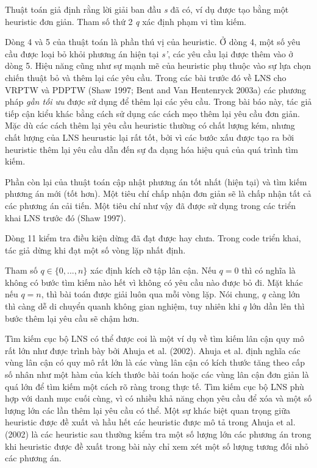 Thuật toán giả định rằng lời giải ban đầu \textit{s} đã có, ví dụ được tạo bằng một heuristic đơn giản. Tham số thứ 2 \textit{q} xác định phạm vi tìm kiếm. 

Dòng 4 và 5 của thuật toán là phần thú vị của heuristic. Ở dòng 4, một số yêu cầu được loại bỏ khỏi phương án hiện tại \textit{s'}, các yêu cầu lại được thêm vào ở dòng 5. Hiệu năng cũng như sự mạnh mẽ của heuristic phụ thuộc vào sự lựa chọn chiến thuật bỏ và thêm lại các yêu cầu. Trong các bài trước đó về LNS cho VRPTW và PDPTW (Shaw 1997; Bent and Van Hentenryck 2003a) các phương pháp \textit{gần tối ưu} được sử dụng để thêm lại các yêu cầu. Trong bài báo này, tác giả tiếp cận kiểu khác bằng cách sử dụng các cách mẹo thêm lại yêu cầu đơn giản. Mặc dù các cách thêm lại yêu cầu heuristic thường có chất lượng kém, nhưng chất lượng của LNS heurustic lại rất tốt, bởi vì các bước xấu được tạo ra bởi heuristic thêm lại yêu cầu dẫn đến sự đa dạng hóa hiệu quả của quá trình tìm kiếm. 

Phần còn lại của thuật toán cập nhật phương án tốt nhất (hiện tại) và tìm kiếm phương án mới (tốt hơn). Một tiêu chí chấp nhận đơn giản sẽ là chấp nhận tất cả các phương án cải tiến. Một tiêu chí như vậy đã được sử dụng trong các triển khai LNS trước đó (Shaw 1997).

Dòng 11 kiểm tra điều kiện dừng đã đạt được hay chưa. Trong code triển khai, tác giả dừng khi đạt một số vòng lặp nhất định.

Tham số $q \in \{0,...,n\}$ xác định kích cỡ tập lân cận. Nếu $q = 0$ thì có nghĩa là không có bước tìm kiếm nào hết vì không có yêu cầu nào được bỏ đi. Mặt khác nếu $q = n$, thì bài toán được giải luôn qua mỗi vòng lặp. Nói chung, $q$
càng lớn thì càng dễ di chuyển quanh không gian nghiệm, tuy nhiên khi $q$ lớn dần lên thì bước thêm lại yêu cầu sẽ chậm hơn. 

Tìm kiếm cục bộ LNS có thể được coi là một ví dụ về tìm kiếm lân cận quy mô rất lớn như được trình bày bởi Ahuja et al. (2002). Ahuja et al. định nghĩa các vùng lân cận có quy mô rất lớn là các vùng lân cận có kích thước tăng theo cấp số nhân như một hàm của kích thước bài toán hoặc các vùng lân cận đơn giản là quá lớn để tìm kiếm một cách rõ ràng trong thực tế. Tìm kiếm cục bộ LNS phù hợp với danh mục cuối cùng, vì có nhiều khả năng chọn yêu cầu để xóa và một số lượng lớn các lần thêm lại yêu cầu có thể. Một sự khác biệt quan trọng giữa heuristic được đề xuất và hầu hết các heuristic được mô tả trong Ahuja et al. (2002) là các heuristic sau thường kiểm tra một số lượng lớn các phương án trong khi heuristic được đề xuất trong bài này chỉ xem xét một số lượng tương đối nhỏ các phương án. 

